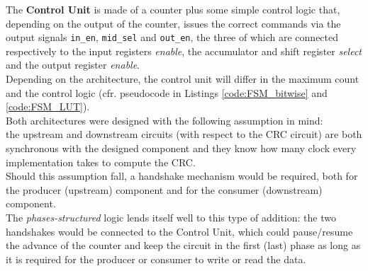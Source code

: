 The \textbf{Control Unit} is made of a counter plus some simple control logic that, depending on the output of the counter, issues the correct commands via the  output signals \texttt{in\_en}, \texttt{mid\_sel} and \texttt{out\_en}, the three of which are connected respectively to the input registers \textit{enable}, the accumulator and shift register \textit{select} and the output register \textit{enable}.\\
Depending on the architecture, the control unit will differ in the maximum count and the control logic (cfr. pseudocode in Listings \ref{code:FSM_bitwise} and \ref{code:FSM_LUT}).\\
\hfill \break
\hfill \break
Both architectures were designed with the following assumption in mind:\\
the upstream and downstream circuits (with respect to the CRC circuit) are both synchronous with the designed component and they know how many clock every implementation takes to compute the CRC.\\
Should this assumption fall, a handshake mechanism would be required, both for the producer (upstream) component and for the consumer (downstream) component.\\
The \textit{phases-structured} logic lends itself well to this type of addition: the two handshakes would be connected to the Control Unit, which could pause/resume the advance of the counter and keep the circuit in the first (last) phase as long as it is required for the producer or consumer to write or read the data.